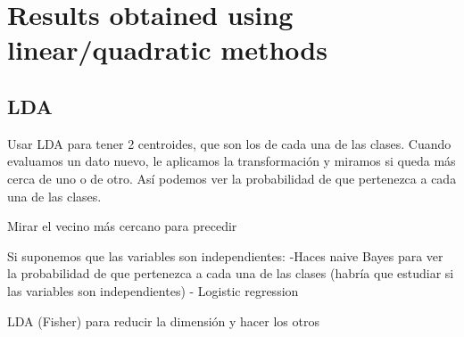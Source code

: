 %
\section{Results obtained using linear/quadratic methods}

\subsection{LDA}
Usar LDA para tener 2 centroides, que son los de cada una de las clases.
Cuando evaluamos un dato nuevo, le aplicamos la transformación y miramos si queda más cerca de uno o de otro.
Así podemos ver la probabilidad de que pertenezca a cada una de las clases.



Mirar el vecino más cercano para precedir

Si suponemos que las variables son independientes:
-Haces naive Bayes para ver la probabilidad de que pertenezca a cada una de las clases
(habría que estudiar si las variables son independientes)
- Logistic regression

LDA (Fisher) para reducir la dimensión y hacer los otros
